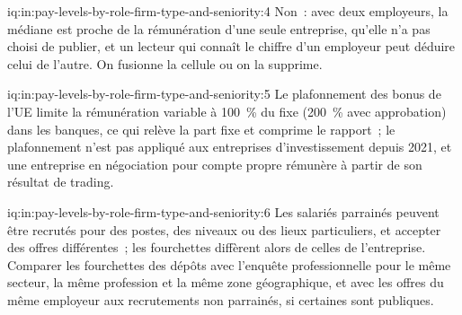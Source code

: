 \begin{solution}{iq:in:pay-levels-by-role-firm-type-and-seniority:4}
Non~: avec deux employeurs, la médiane est proche de la rémunération d'une seule entreprise, qu'elle n'a pas choisi de publier, et un lecteur
qui connaît le chiffre d'un employeur peut déduire celui de l'autre. On fusionne la cellule ou on la supprime.
\end{solution}

\begin{solution}{iq:in:pay-levels-by-role-firm-type-and-seniority:5}
Le plafonnement des bonus de l'UE limite la rémunération variable à 100~\% du fixe (200~\% avec approbation) dans les banques, ce qui relève la part fixe et comprime
le rapport~; le plafonnement n'est pas appliqué aux entreprises d'investissement depuis 2021, et une entreprise en négociation pour compte propre rémunère à partir de son
résultat de trading.
\end{solution}

\begin{solution}{iq:in:pay-levels-by-role-firm-type-and-seniority:6}
Les salariés parrainés peuvent être recrutés pour des postes, des niveaux ou des lieux particuliers, et accepter des offres différentes~; les fourchettes
diffèrent alors de celles de l'entreprise. Comparer les fourchettes des dépôts avec l'enquête professionnelle pour le même secteur, la même profession
et la même zone géographique, et avec les offres du même employeur aux recrutements non parrainés, si certaines sont publiques.
\end{solution}
